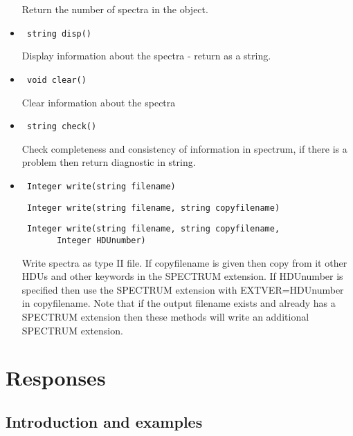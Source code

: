 \documentclass[11pt]{book}
\begin{document}
\begin{itemize}
           Return the number of spectra in the object.

\item    \begin{verbatim} string disp() \end{verbatim}

           Display information about the spectra - return as a string.

\item    \begin{verbatim} void clear() \end{verbatim}

           Clear information about the spectra

\item    \begin{verbatim} string check() \end{verbatim}

           Check completeness and consistency of information in spectrum,
           if there is a problem then return diagnostic in string.

\item  \begin{verbatim} Integer write(string filename) \end{verbatim}
       \begin{verbatim} Integer write(string filename, string copyfilename) \end{verbatim}
       \begin{verbatim} Integer write(string filename, string copyfilename,
       Integer HDUnumber) \end{verbatim}

          Write spectra as type II file. If copyfilename is given then
          copy from it other HDUs and other keywords in the SPECTRUM
          extension. If HDUnumber is specified then use the SPECTRUM
          extension with EXTVER=HDUnumber in copyfilename. Note that 
          if the output filename exists and already has a SPECTRUM 
          extension then these methods will write an additional 
          SPECTRUM extension.

\end{itemize}

\section{Responses}

\subsection{Introduction and examples}
\end{document}
